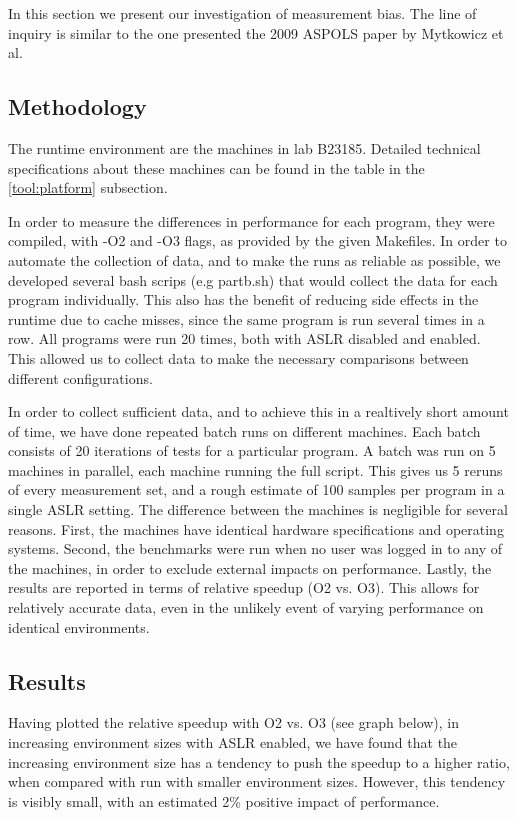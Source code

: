 \documentclass{article}
\begin{document}
In this section we present our investigation of measurement bias. The line of inquiry is similar to the one presented the 2009 ASPOLS paper by Mytkowicz et al.

\subsection{Methodology}
The runtime environment are the machines in lab B23185. Detailed technical specifications about these machines can be found in the table in the \ref{tool:platform} subsection.

In order to measure the differences in performance for each program, they were compiled, with -O2 and -O3 flags, as provided by the given Makefiles. In order to automate the collection of data, and to make the runs as reliable as possible, we developed several bash scrips (e.g partb.sh) that would collect the data for each program individually. This also has the benefit of reducing side effects in the runtime due to cache misses, since the same program is run several times in a row. All programs were run 20 times, both with ASLR disabled and enabled. This allowed us to collect data to make the necessary comparisons between different configurations.

In order to collect sufficient data, and to achieve this in a realtively short amount of time, we have done repeated batch runs on different machines. Each batch consists of 20 iterations of tests for a particular program. A batch was run on 5 machines in parallel, each machine running the full script. This gives us 5 reruns of every measurement set, and a rough estimate of 100 samples per program in a single ASLR setting. The difference between the machines is negligible for several reasons. First, the machines have identical hardware specifications and operating systems. Second, the benchmarks were run when no user was logged in to any of the machines, in order to exclude external impacts on performance. Lastly, the results are reported in terms of relative speedup (O2 vs. O3). This allows for relatively accurate data, even in the unlikely event of varying performance on identical environments.

\subsection{Results}

Having plotted the relative speedup with O2 vs. O3 (see graph below), in increasing environment sizes with ASLR enabled, we have found that the increasing environment size has a tendency to push the speedup to a higher ratio, when compared with run with smaller environment sizes. However, this tendency is visibly small, with an estimated 2\% positive impact of performance.
\end{document}
